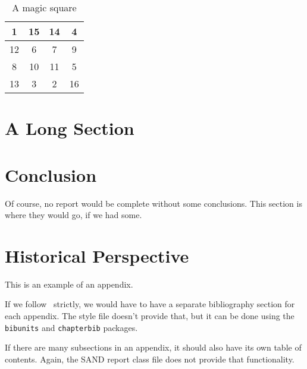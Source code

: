 \documentclass[12pt,strict]{SANDreport}
\begin{document}
	    \begin{table}[ht]
		\centering
		\caption{A magic square}
		\bigskip

		\begin{tabular}{|c|c|c|c|}
		    \hline
			1 & 15 & 14 & 4 \\ \hline
			12 & 6 & 7 & 9 \\ \hline
			8 & 10 & 11 & 5 \\ \hline
			13 & 3 & 2 & 16 \\ \hline
		\end{tabular}
		\label{tab2}
	    \end{table}


    \section{A Long Section}

	\newcommand{\myblaA}{bla bla bla bla bla bla bla bla bla bla }

    \section{Conclusion}
	Of course, no report would be complete without some conclusions.
	This section is where they would go, if we had some.


    \clearpage
    
    


    \appendix
    \section{Historical Perspective}
	This is an example of an appendix.

	If we follow~\cite{Sand98-0730} strictly, we would have to
	have a separate bibliography section for each appendix.
	The style file doesn't provide that, but it can be done
	using the {\tt bibunits} and {\tt chapterbib} packages.

	If there are many subsections in an appendix, it should also
	have its own table of contents. Again, the SAND report class
	file does not provide that functionality.
\end{document}
